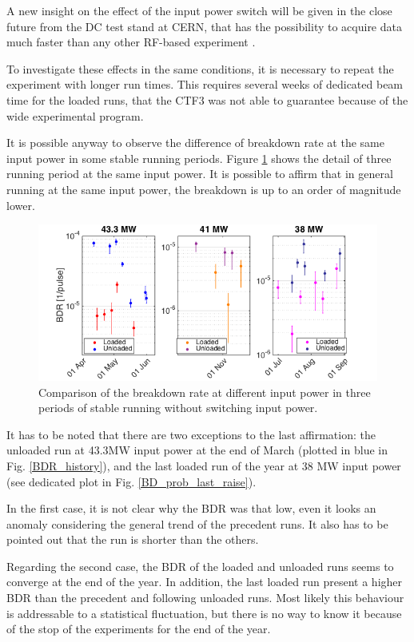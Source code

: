 A new insight on the effect of the input power switch will be given in the close future from the DC test stand at CERN, that has the possibility to acquire data much faster than any other RF-based experiment \cite{Walter:PC}.

To investigate these effects in the same conditions, it is necessary to repeat the experiment with longer run times. This requires several weeks of dedicated beam time for the loaded runs, that the CTF3 was not able to guarantee because of the wide experimental program.

It is possible anyway to observe the difference of breakdown rate at the same input power in some stable running periods. Figure \ref{BD_prob} shows the detail of three running period at the same input power. It is possible to affirm that in general running at the same input power, the breakdown is up to an order of magnitude lower. 


\begin{figure}[h]
\centering 
\includegraphics[scale=0.6]{pictures/BDR_zooms.png}
\caption{Comparison of the breakdown rate at different input power in three periods of stable running without switching input power.}
\label{BD_prob}
\end{figure}

It has to be noted that there are two exceptions to the last affirmation: the unloaded run at 43.3MW input power at the end of March (plotted in blue in Fig. \ref{BDR_history}), and the last loaded run of the year at 38 MW input power (see dedicated plot in Fig. \ref{BD_prob_last_raise}). 

In the first case, it is not clear why the BDR was that low, even it looks an anomaly considering the general trend of the precedent runs. It also has to be pointed out that the run is shorter than the others.

Regarding the second case, the BDR of the loaded and unloaded runs seems to converge at the end of the year. In addition, the last loaded run present a higher BDR than the precedent and following unloaded runs. Most likely this behaviour is addressable to a statistical fluctuation, but there is no way to know it because of the stop of the experiments for the end of the year.


